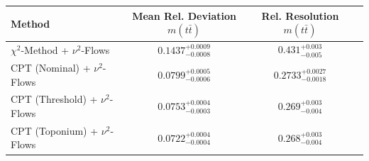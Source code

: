     \begin{tabular}{lccc}
        \toprule
        Method & Mean Rel. Deviation $m(t\bar{t})$ & Rel. Resolution $m(t\bar{t})$ \\
        \midrule
        $\chi^2$-Method + $\nu^2$-Flows & $0.1437^{+0.0009}_{-0.0008}$ & $0.431^{+0.003}_{-0.005}$ \\
        CPT (Nominal) + $\nu^2$-Flows & $0.0799^{+0.0005}_{-0.0006}$ & $0.2733^{+0.0027}_{-0.0018}$ \\
        CPT (Threshold) + $\nu^2$-Flows & $0.0753^{+0.0004}_{-0.0003}$ & $0.269^{+0.003}_{-0.004}$ \\
        CPT (Toponium) + $\nu^2$-Flows & $0.0722^{+0.0004}_{-0.0004}$ & $0.268^{+0.003}_{-0.004}$ \\
        \bottomrule
    \end{tabular}